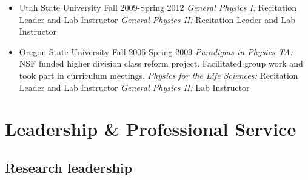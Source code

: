 \documentclass[11pt,letterpaper,sans,unicode]{moderncv}
\begin{document}
\begin{itemize}[leftmargin=8mm]
	\item Utah State University \hfill Fall 2009-Spring 2012
            	\newline \textit{General Physics I:} Recitation Leader and Lab Instructor
            	\newline \textit{General Physics II:} Recitation Leader and Lab Instructor
       	 \item Oregon State University  \hfill Fall 2006-Spring 2009
            	\newline \textit{Paradigms in Physics TA:} NSF funded higher division class reform project.
		\newline Facilitated group work and took part in curriculum meetings.
           	\newline \textit{Physics for the Life Sciences:} Recitation Leader and Lab Instructor
            	\newline \textit{General Physics II:} Lab Instructor
\end{itemize}

\section{Leadership \& Professional Service}

\subsection{Research leadership}
 \vspace{-0.1cm}

 \vspace{-0.1cm}

 \vspace{-0.1cm}
\end{document}
